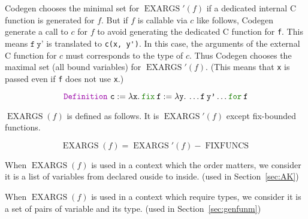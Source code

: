 \documentclass[a4paper,fleqn]{article}
\def\codegen{\textrm{Codegen}}
\newcommand{\kwDefinition}{\mbox{\color{myviolet}\ttfamily Definition}}
\newcommand{\kwfix}{\mbox{\color{mygreen}\ttfamily fix}}
\newcommand{\kwfor}{\mbox{\color{mygreen}\ttfamily for}}
\newcommand{\lam}[2]{\lambda #1.\:#2}
\newcommand{\ofix}[2]{\kwfix\:{#1}\:\kwfor\:{#2}}
\DeclareMathOperator{\FIXFUNCS}{FIXFUNCS}
\DeclareMathOperator{\EXARGS}{EXARGS}
\newcommand{\secref}[1]{Section~\ref{#1}}
\begin{document}
\codegen{} chooses the minimal set for $\EXARGS'(f)$ if a dedicated internal C function is generated for $f$.
But if $f$ is callable via $c$ like follows, \codegen{} generate a call to $c$ for $f$
to avoid generating the dedicated C function for \texttt{f}.
This means $\texttt{f}\:\texttt{y'}$ is translated to \lstinline[style=Cstyle]!c(x, y')!.
In this case, the arguments of the external C function for $c$ must corresponds to the type of $c$.
Thus \codegen{} chooses the maximal set (all bound variables) for $\EXARGS'(f)$.
(This means that \texttt{x} is passed even if \texttt{f} does not use \texttt{x}.)

\[
  \kwDefinition~\texttt{c} := \lam{\texttt{x}}{\ofix{\texttt{f}:=\lam{\texttt{y}}{\ldots \texttt{f}\:\texttt{y'} \ldots}}{\texttt{f}}}
\]

$\EXARGS(f)$ is defined as follows.
It is $\EXARGS'(f)$ except fix-bounded functions.

\[
  \EXARGS(f) = \EXARGS'(f) - \FIXFUNCS
\]

When $\EXARGS(f)$ is used in a context which the order matters,
we consider it is a list of variables from declared ouside to inside.
(used in \secref{sec:AK})

When $\EXARGS(f)$ is used in a context which require types,
we consider it is a set of pairs of variable and its type.
(used in \secref{sec:genfunm})
\end{document}
